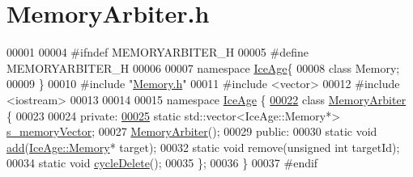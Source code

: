 \hypertarget{MemoryArbiter_8h_source}{}\section{Memory\+Arbiter.\+h}
\label{MemoryArbiter_8h_source}

\begin{DoxyCode}
00001 
00004 \textcolor{preprocessor}{#ifndef MEMORYARBITER\_H}
00005 \textcolor{preprocessor}{#define MEMORYARBITER\_H}
00006 
00007 \textcolor{keyword}{namespace }\hyperlink{namespaceIceAge}{IceAge}\{
00008     \textcolor{keyword}{class }Memory;
00009 \}
00010 \textcolor{preprocessor}{#include "\hyperlink{Memory_8h}{Memory.h}"}
00011 \textcolor{preprocessor}{#include <vector>}
00012 \textcolor{preprocessor}{#include <iostream>}
00013 
00014 
00015 \textcolor{keyword}{namespace }\hyperlink{namespaceIceAge}{IceAge} \{
\hypertarget{MemoryArbiter_8h_source.tex_l00022}{}\hyperlink{classIceAge_1_1MemoryArbiter}{00022}     \textcolor{keyword}{class }\hyperlink{classIceAge_1_1MemoryArbiter}{MemoryArbiter} \{
00023 
00024     \textcolor{keyword}{private}:
\hypertarget{MemoryArbiter_8h_source.tex_l00025}{}\hyperlink{classIceAge_1_1MemoryArbiter_a23e5c384f4c4526d7caf0954668d6543}{00025}         \textcolor{keyword}{static} std::vector<IceAge::Memory*> \hyperlink{classIceAge_1_1MemoryArbiter_a23e5c384f4c4526d7caf0954668d6543}{s\_memoryVector};
00027         \hyperlink{classIceAge_1_1MemoryArbiter_a1e6bf2eef9d3fb964f6665b94f011024}{MemoryArbiter}();
00029     \textcolor{keyword}{public}:
00030         \textcolor{keyword}{static} \textcolor{keywordtype}{void} \hyperlink{classIceAge_1_1MemoryArbiter_a219f22e94979f934a63a0fd28ef889f7}{add}(\hyperlink{classIceAge_1_1Memory}{IceAge::Memory}* target);
00032         \textcolor{keyword}{static} \textcolor{keywordtype}{void} \textcolor{keyword}{remove}(\textcolor{keywordtype}{unsigned} \textcolor{keywordtype}{int} targetId);
00034         \textcolor{keyword}{static} \textcolor{keywordtype}{void} \hyperlink{classIceAge_1_1MemoryArbiter_ae3460492678cf992629f4a70de3ef1ca}{cycleDelete}();
00035     \};
00036 \}
00037 \textcolor{preprocessor}{#endif}
\end{DoxyCode}
